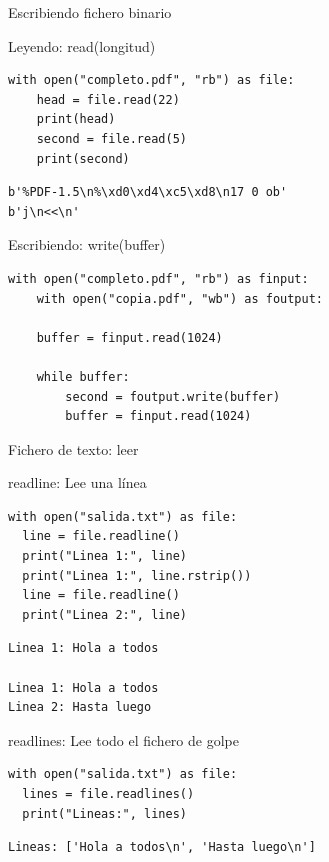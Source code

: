 \documentclass[bigger,unknownkeysallowed]{beamer}
\begin{document}
\begin{frame}[fragile,label={sec:org6416730}]{Escribiendo fichero binario}
 \begin{block}{Leyendo: read(longitud)}
\begin{verbatim}
with open("completo.pdf", "rb") as file:
    head = file.read(22)
    print(head)
    second = file.read(5)
    print(second)
\end{verbatim}
\scriptsize
\begin{verbatim}
b'%PDF-1.5\n%\xd0\xd4\xc5\xd8\n17 0 ob'
b'j\n<<\n'
\end{verbatim}
\end{block}

\begin{block}{Escribiendo: write(buffer)}
\begin{verbatim}
with open("completo.pdf", "rb") as finput:
    with open("copia.pdf", "wb") as foutput:

	buffer = finput.read(1024)

	while buffer:
	    second = foutput.write(buffer)
	    buffer = finput.read(1024)
\end{verbatim}
\scriptsize
\end{block}
\end{frame}

\begin{frame}[fragile,label={sec:org516a067}]{Fichero de texto: leer}
 \begin{block}{readline: Lee una línea}
\begin{verbatim}
with open("salida.txt") as file:
  line = file.readline()
  print("Linea 1:", line)
  print("Linea 1:", line.rstrip())
  line = file.readline()
  print("Linea 2:", line)
\end{verbatim}
\scriptsize
\begin{verbatim}
Linea 1: Hola a todos

Linea 1: Hola a todos
Linea 2: Hasta luego
\end{verbatim}
\end{block}

\begin{block}{readlines: Lee todo el fichero de golpe}
\begin{verbatim}
with open("salida.txt") as file:
  lines = file.readlines()
  print("Lineas:", lines)
\end{verbatim}
\scriptsize
\begin{verbatim}
Lineas: ['Hola a todos\n', 'Hasta luego\n']
\end{verbatim}
\end{block}
\end{frame}
\end{document}
